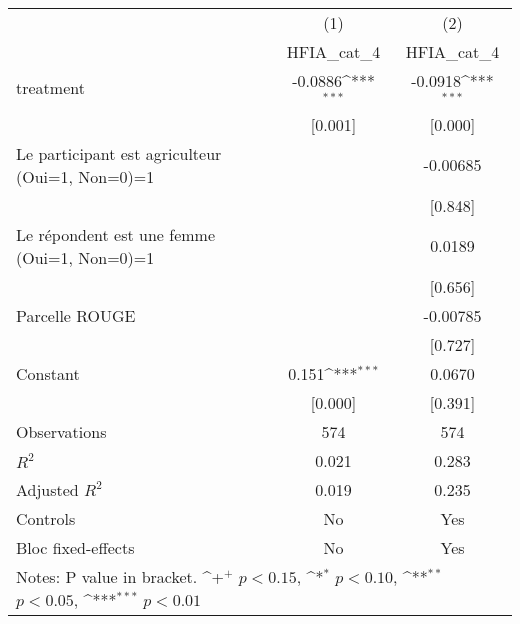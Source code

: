 {
\def\sym#1{\ifmmode^{#1}\else\(^{#1}\)\fi}
\begin{tabular*}{1.2\hsize}{@{\hskip\tabcolsep\extracolsep\fill}l*{2}{c}}
\cline{2-3}\cline{2-3}
     &\multicolumn{1}{c}{(1)}&\multicolumn{1}{c}{(2)}\\
     &\multicolumn{1}{c}{HFIA\_cat\_4}&\multicolumn{1}{c}{HFIA\_cat\_4}\\
\cline{2-3}
treatment&-0.0886\sym{***}&-0.0918\sym{***}\\
     &[0.001]         &[0.000]         \\
[1em]
Le participant est agriculteur (Oui=1, Non=0)=1&           &-0.00685         \\
     &           &[0.848]         \\
[1em]
Le répondent est une femme (Oui=1, Non=0)=1&           &0.0189         \\
     &           &[0.656]         \\
[1em]
Parcelle ROUGE&           &-0.00785         \\
     &           &[0.727]         \\
[1em]
Constant&0.151\sym{***}&0.0670         \\
     &[0.000]         &[0.391]         \\
\cline{2-3}
Observations&574         &574         \\
\(R^{2}\)&0.021         &0.283         \\
Adjusted \(R^{2}\)&0.019         &0.235         \\
Controls&No         &Yes         \\
Bloc fixed-effects&No         &Yes         \\
\cline{2-3}\cline{2-3}
\multicolumn{3}{p{1.0\textwidth}}{\footnotesize Notes: P value in bracket. \sym{+} \(p<0.15\), \sym{*} \(p<0.10\), \sym{**} \(p<0.05\), \sym{***} \(p<0.01\)}\\
\end{tabular*}
}
